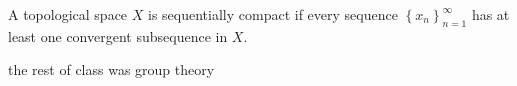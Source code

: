 \begin{definition}\label{dfn:5.3}
	A topological space $X$ is sequentially compact if every sequence $\left\{ x_n \right\}_{n=1} ^{\infty } $ has at least one convergent subsequence in $X$.
\end{definition}

the rest of class was group theory
